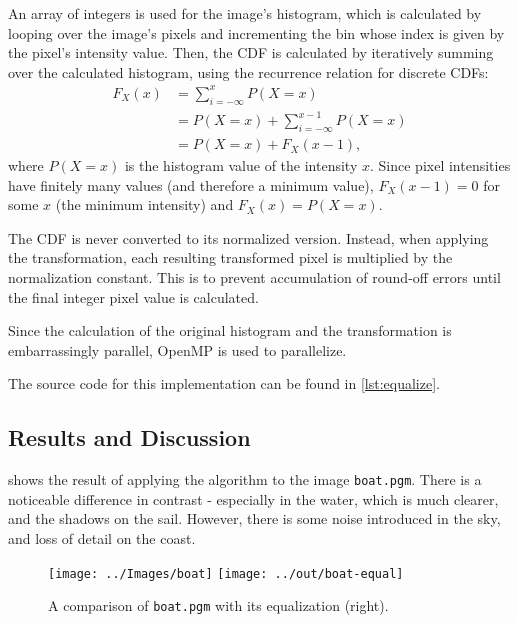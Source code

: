 \documentclass[headings=optiontoheadandtoc,listof=totoc,parskip=full]{scrartcl}
\begin{document}
An array of integers is used for the image's histogram, which is calculated by looping over the image's pixels and incrementing the bin whose index is given by the pixel's intensity value. Then, the CDF is calculated by iteratively summing over the calculated histogram, using the recurrence relation for discrete CDFs:
\begin{equation}
	\begin{aligned}
		F_X(x) &= \sum_{i = -\infty}^x P(X = x)\\
			&= P(X = x) + \sum_{i = -\infty}^{x - 1} P(X = x)\\
			&= P(X = x) + F_X(x - 1),
	\end{aligned}
\end{equation}
where $P(X = x)$ is the histogram value of the intensity $x$. Since pixel intensities have finitely many values (and therefore a minimum value), $F_X(x - 1) = 0$ for some $x$ (the minimum intensity) and $F_X(x) = P(X = x)$.

The CDF is never converted to its normalized version. Instead, when applying the transformation, each resulting transformed pixel is multiplied by the normalization constant. This is to prevent accumulation of round-off errors until the final integer pixel value is calculated.

Since the calculation of the original histogram and the transformation is embarrassingly parallel, OpenMP is used to parallelize.

The source code for this implementation can be found in \cref{lst:equalize}.

\subsection{Results and Discussion}
\label{sec:equalization-results}

 shows the result of applying the algorithm to the image \texttt{boat.pgm}. There is a noticeable difference in contrast - especially in the water, which is much clearer, and the shadows on the sail. However, there is some noise introduced in the sky, and loss of detail on the coast.

\begin{figure}[H]
	\centering
	\texttt{[image: ../Images/boat]}
	\texttt{[image: ../out/boat-equal]}
	\caption{A comparison of \texttt{boat.pgm} with its equalization (right).}
	\label{fig:equal-result-1}
\end{figure}
\end{document}
